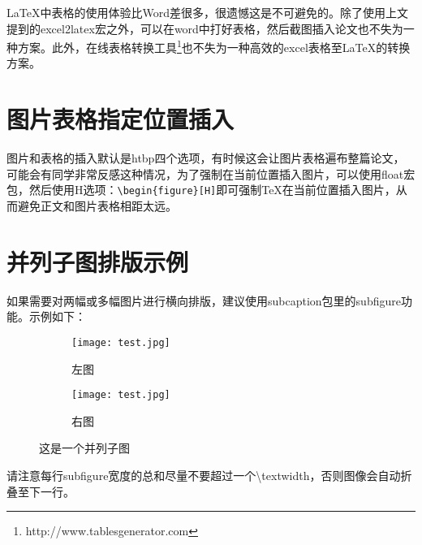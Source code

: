 \LaTeX 中表格的使用体验比Word差很多，很遗憾这是不可避免的。除了使用上文提到的excel2latex宏之外，可以在word中打好表格，然后截图插入论文也不失为一种方案。此外，在线表格转换工具\footnote{http://www.tablesgenerator.com}也不失为一种高效的excel表格至\LaTeX 的转换方案。

\section{图片表格指定位置插入}

图片和表格的插入默认是htbp四个选项，有时候这会让图片表格遍布整篇论文，可能会有同学非常反感这种情况，为了强制在当前位置插入图片，可以使用float宏包，然后使用H选项：\verb+\begin{figure}[H]+即可强制\TeX 在当前位置插入图片，从而避免正文和图片表格相距太远。

\section{并列子图排版示例}

如果需要对两幅或多幅图片进行横向排版，建议使用subcaption包里的subfigure功能。示例如下：

\begin{figure}[H]
\centering
\begin{subfigure}{.45\textwidth}
  \centering
  \texttt{[image: test.jpg]}
  \caption{左图}
  \label{fig:test_subfigure1}
\end{subfigure}
\begin{subfigure}{.45\textwidth}
  \centering
  \texttt{[image: test.jpg]}
  \caption{右图}
  \label{fig:test_subfigure2}
\end{subfigure}
\caption{这是一个并列子图}
\label{fig:test_subfigure}
\end{figure}

请注意每行subfigure宽度的总和尽量不要超过一个\textbackslash textwidth，否则图像会自动折叠至下一行。